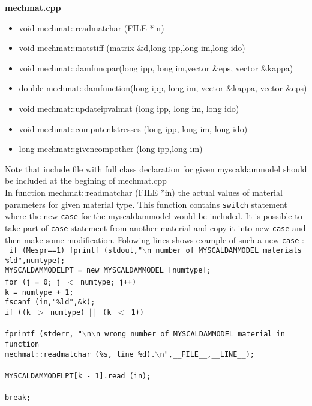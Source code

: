 {\bf mechmat.cpp}\\
\begin{itemize}
\item {\sf void mechmat::readmatchar (FILE *in)}
\item {\sf void mechmat::matstiff (matrix \&d,long ipp,long im,long ido)}
\item {\sf void mechmat::damfuncpar(long ipp, long im,vector \&eps, vector \&kappa)}
\item {\sf double mechmat::damfunction(long ipp, long im, vector \&kappa, vector \&eps)}
\item {\sf void mechmat::updateipvalmat (long ipp, long im, long ido)}
\item {\sf void mechmat::computenlstresses (long ipp, long im, long ido)}
\item {\sf long mechmat::givencompother (long ipp,long im)}
\end{itemize}
Note that include file with full class declaration for given {\sf myscaldammodel} should be included at the begining
of mechmat.cpp\\

In function {\sf mechmat::readmatchar (FILE *in)} the actual values of material parameters for given material type. This function
contains {\tt switch} statement where the new {\tt case} for the  {\sf myscaldammodel} would be included.
It is possible to take part of {\tt case} statement from another material and copy it into new {\tt case} and then
make some modification. Folowing lines shows example of such a new {\tt case} :\\
{\tt
      if (Mespr==1)  fprintf (stdout,"$\backslash$n number of MYSCALDAMMODEL materials \%ld",numtype);\\
      MYSCALDAMMODELPT = new MYSCALDAMMODEL [numtype];\\
      for (j = 0; j $<$ numtype; j++){\\
        k = numtype + 1;\\
        fscanf (in,"\%ld",\&k);\\
        if ((k $>$ numtype) $\mid\mid$ (k $<$ 1))\\
        {\\
          fprintf (stderr, "$\backslash$n$\backslash$n wrong number of MYSCALDAMMODEL material in function\\
                   mechmat::readmatchar (\%s, line \%d).$\backslash$n",\_\_FILE\_\_,\_\_LINE\_\_);\\
        }\\
        MYSCALDAMMODELPT[k - 1].read (in);\\
      }\\
      break;\\
}

